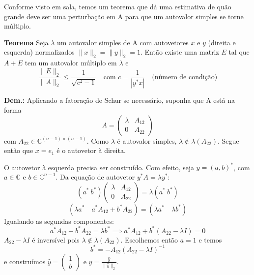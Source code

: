 \documentclass{article}
\begin{document}

Conforme visto em sala, temos um teorema que dá uma estimativa de quão grande deve ser uma perturbação em A para que um autovalor simples se torne múltiplo.

\textbf{Teorema} Seja $\lambda$ um autovalor simples de A com autovetores $x$ e $y$ (direita e esquerda) normalizados $\|x\|_2 = \|y\|_2 = 1$. Então existe uma matriz $E$ tal que $A+E$ tem um autovalor múltiplo em $\lambda$ e
\[ \frac{\|E\|_2}{\|A\|_2} \le \frac{1}{\sqrt{c^2-1}} \quad \text{com } c = \frac{1}{|y^*x|} \quad \text{(número de condição)} \]

\medskip 

\textbf{Dem.:} Aplicando a fatoração de Schur se necessário, suponha que A está na forma
\[ A = \begin{pmatrix} \lambda & A_{12} \\ 0 & A_{22} \end{pmatrix} \]
com $A_{22} \in \mathbb{C}^{(n-1) \times (n-1)}$.
Como $\lambda$ é autovalor simples, $\lambda \notin \lambda(A_{22})$.
Segue então que $x=e_1$ é o autovetor à direita. 

O autovetor à esquerda precisa ser construído. Com efeito, seja $y = (a, b)^*$, com $a \in \mathbb{C}$ e $b \in \mathbb{C}^{n-1}$.
Da equação de autovetor $y^*A = \lambda y^*$:
\[ (a^* \ b^*) \begin{pmatrix} \lambda & A_{12} \\ 0 & A_{22} \end{pmatrix} = \lambda (a^* \ b^*) \]
\[ (\lambda a^* \quad a^*A_{12} + b^*A_{22}) = (\lambda a^* \quad \lambda b^*) \]
Igualando as segundas componentes:
\[ a^*A_{12} + b^*A_{22} = \lambda b^* \implies a^*A_{12} + b^*(A_{22} - \lambda I) = 0 \]
$A_{22} - \lambda I$ é inversível pois $\lambda \notin \lambda(A_{22})$.
Escolhemos então $a=1$ e temos
\[ b^* = -A_{12}(A_{22} - \lambda I)^{-1} \]
e construímos $\hat{y} = \begin{pmatrix} 1 \\ b \end{pmatrix}$ e $y = \frac{\hat{y}}{\|\hat{y}\|_2}$.

\end{document}
